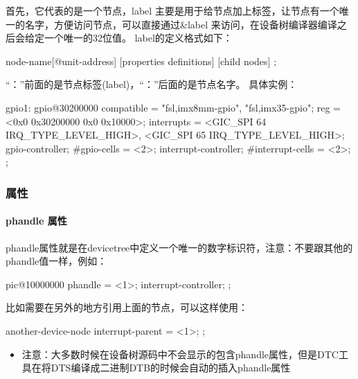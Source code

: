 首先，它代表的是一个节点，label 主要是用于给节点加上标签，让节点有一个唯一的名字，方便访问节点，可以直接通过\&label 来访问，在设备树编译器编译之后会给定一个唯一的32位值。
label的定义格式如下：

\begin{CodeBlock}[language=BookDTS]
    [label:] node-name[@unit-address] {
        [properties definitions]
        [child nodes]
    };
\end{CodeBlock}

``：''前面的是节点标签(label)，``：''后面的是节点名字。
具体实例：

\begin{CodeBlock}[language=BookDTS]
gpio1: gpio@30200000 {
    compatible = "fsl,imx8mm-gpio", "fsl,imx35-gpio";
    reg = <0x0 0x30200000 0x0 0x10000>;
    interrupts = <GIC_SPI 64 IRQ_TYPE_LEVEL_HIGH>,
             <GIC_SPI 65 IRQ_TYPE_LEVEL_HIGH>;
    gpio-controller;
    #gpio-cells = <2>;
    interrupt-controller;
    #interrupt-cells = <2>;
};
\end{CodeBlock}

\subsubsection{属性}\label{sec:13-operating-system-018}

\paragraph{phandle 属性}\label{sec:13-operating-system-019}

phandle属性就是在devicetree中定义一个唯一的数字标识符，注意：不要跟其他的phandle值一样，例如：

\begin{CodeBlock}[language=BookDTS]
pic@10000000 {
    phandle = <1>;
    interrupt-controller;
};
\end{CodeBlock}

比如需要在另外的地方引用上面的节点，可以这样使用：

\begin{CodeBlock}[language=BookDTS]
another-device-node {
    interrupt-parent = <1>;
};
\end{CodeBlock}

\begin{itemize}
\tightlist
\item
  注意：大多数时候在设备树源码中不会显示的包含phandle属性，但是DTC工具在将DTS编译成二进制DTB的时候会自动的插入phandle属性
\end{itemize}

